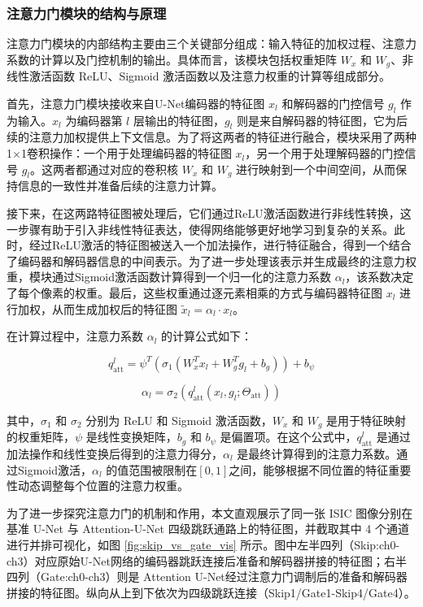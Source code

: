 \subsubsection{注意力门模块的结构与原理}

注意力门模块的内部结构主要由三个关键部分组成：输入特征的加权过程、注意力系数的计算以及门控机制的输出。具体而言，该模块包括权重矩阵 $W_x$ 和 $W_g$、非线性激活函数 ReLU、Sigmoid 激活函数以及注意力权重的计算等组成部分。

首先，注意力门模块接收来自U-Net编码器的特征图 $x_l$ 和解码器的门控信号 $g_l$ 作为输入。$x_l$ 为编码器第 $l$ 层输出的特征图，$g_l$ 则是来自解码器的特征图，它为后续的注意力加权提供上下文信息。为了将这两者的特征进行融合，模块采用了两种1×1卷积操作：一个用于处理编码器的特征图 $x_l$，另一个用于处理解码器的门控信号 $g_l$。这两者都通过对应的卷积核 $W_x$ 和 $W_g$ 进行映射到一个中间空间，从而保持信息的一致性并准备后续的注意力计算。

接下来，在这两路特征图被处理后，它们通过ReLU激活函数进行非线性转换，这一步骤有助于引入非线性特征表达，使得网络能够更好地学习到复杂的关系。此时，经过ReLU激活的特征图被送入一个加法操作，进行特征融合，得到一个结合了编码器和解码器信息的中间表示。为了进一步处理该表示并生成最终的注意力权重，模块通过Sigmoid激活函数计算得到一个归一化的注意力系数 $\alpha_l$，该系数决定了每个像素的权重。最后，这些权重通过逐元素相乘的方式与编码器特征图 $x_l$ 进行加权，从而生成加权后的特征图 $\tilde{x}_l = \alpha_l \cdot x_l$。

在计算过程中，注意力系数 $\alpha_l$ 的计算公式如下：

\begin{equation}
    q_{\text{att}}^l = \psi^T \left( \sigma_1 (W_x^T x_l + W_g^T g_l + b_g) \right) + b_\psi
\end{equation}

\begin{equation}
    \alpha_l = \sigma_2 \left( q_{\text{att}}^l(x_l, g_l; \Theta_{\text{att}}) \right)
\end{equation}

其中，$\sigma_1$ 和 $\sigma_2$ 分别为 ReLU 和 Sigmoid 激活函数，$W_x$ 和 $W_g$ 是用于特征映射的权重矩阵，$\psi$ 是线性变换矩阵，$b_g$ 和 $b_\psi$ 是偏置项。在这个公式中，$q_{\text{att}}^l$ 是通过加法操作和线性变换后得到的注意力得分，$\alpha_l$ 是最终计算得到的注意力系数。通过Sigmoid激活，$\alpha_l$ 的值范围被限制在$[0, 1]$之间，能够根据不同位置的特征重要性动态调整每个位置的注意力权重。

为了进一步探究注意力门的机制和作用，本文直观展示了同一张 ISIC 图像分别在基准 U-Net 与 Attention-U-Net 四级跳跃通路上的特征图，并截取其中 4 个通道进行并排可视化，如图 \ref{fig:skip_vs_gate_vis} 所示。图中左半四列（Skip:ch0-ch3）对应原始U-Net网络的编码器跳跃连接后准备和解码器拼接的特征图；右半四列（Gate:ch0-ch3）则是 Attention U-Net经过注意力门调制后的准备和解码器拼接的特征图。纵向从上到下依次为四级跳跃连接（Skip1/Gate1-Skip4/Gate4）。

